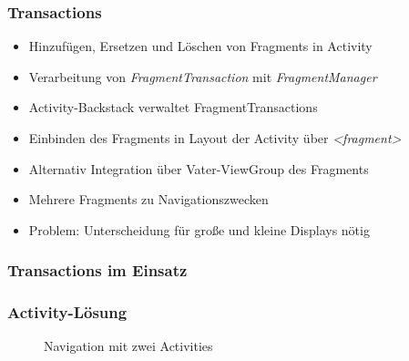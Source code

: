 \begin{frame}[label=fragment_transactions]
   \frametitle{Transactions}
   \begin{itemize}
      \item Hinzufügen, Ersetzen und Löschen von Fragments in Activity
      \item Verarbeitung von \emph{FragmentTransaction} mit \emph{FragmentManager}
      \item Activity-Backstack verwaltet FragmentTransactions
      \item Einbinden des Fragments in Layout der Activity über \emph{\textless{}fragment\textgreater}
      \item Alternativ Integration über Vater-ViewGroup des Fragments
      \item Mehrere Fragments zu Navigationszwecken
      \item Problem: Unterscheidung für große und kleine Displays nötig
   \end{itemize}
\end{frame}

\begin{frame}[label=fragment_transactions]
   \frametitle{Transactions im Einsatz}
	
\end{frame}

\begin{frame}[label=activity_layout]
   \frametitle{Activity-Lösung}
	\begin{figure}[h!]
	  \centering
	  \hfill
	  \caption{
		  Navigation mit zwei Activities
	  }
	  \label{fig:ubuntu_activity_list}
	\end{figure}
\end{frame}


